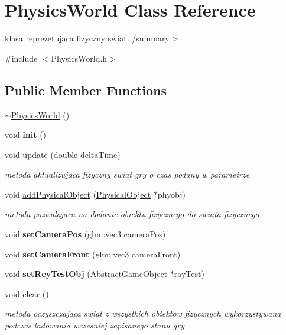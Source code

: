 \hypertarget{class_physics_world}{}\section{Physics\+World Class Reference}
\label{class_physics_world}


klasa reprezetujaca fizyczny swiat. /summary$>$  




{\ttfamily \#include $<$Physics\+World.\+h$>$}

\subsection*{Public Member Functions}
\begin{DoxyCompactItemize}
\item 
\hyperlink{class_physics_world_abf1573b008b52b60a83a8f36cbdd51bc}{$\sim$\+Physics\+World} ()
\item 
\mbox{\label{class_physics_world_aad64a97f3734de0937f12d665dae7dab}} 
void {\bfseries init} ()
\item 
void \hyperlink{class_physics_world_aebc88d1b3c209a48c2abf0c8a4aabd51}{update} (double delta\+Time)
\begin{DoxyCompactList}\small\item\em metoda aktualizujaca fizyczny swiat gry o czas podany w parametrze \end{DoxyCompactList}\item 
void \hyperlink{class_physics_world_aa97ff9b7388afe747b447b42aeccfb8c}{add\+Physical\+Object} (\hyperlink{class_physical_object}{Physical\+Object} $\ast$phyobj)
\begin{DoxyCompactList}\small\item\em metoda pozwalajaca na dodanie obiektu fizycznego do swiata fizycznego \end{DoxyCompactList}\item 
\mbox{\label{class_physics_world_a9bd79f2fc82a6e50c1ae94719fe9b67f}} 
void {\bfseries set\+Camera\+Pos} (glm\+::vec3 camera\+Pos)
\item 
\mbox{\label{class_physics_world_a6ab733de6f30178a41455d27cd29bf0d}} 
void {\bfseries set\+Camera\+Front} (glm\+::vec3 camera\+Front)
\item 
\mbox{\label{class_physics_world_a84a45466593d61dce71666d87edf2038}} 
void {\bfseries set\+Rey\+Test\+Obj} (\hyperlink{class_abstract_game_object}{Abstract\+Game\+Object} $\ast$ray\+Test)
\item 
void \hyperlink{class_physics_world_a948724c83bcd3d69a0977b5c9e2b9ac4}{clear} ()
\begin{DoxyCompactList}\small\item\em metoda oczyszczajaca swiat z wszystkich obiektow fizycznych wykorzystywana podczas ladowania wczesniej zapisanego stanu gry \end{DoxyCompactList}\end{DoxyCompactItemize}


